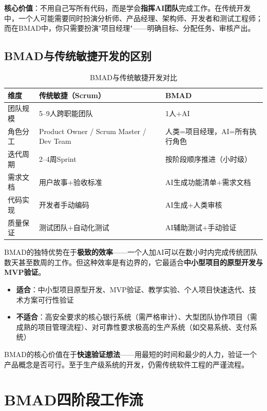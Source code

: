 \textbf{核心价值}：不用自己写所有代码，而是学会\textbf{指挥AI团队}完成工作。在传统开发中，一个人可能需要同时扮演分析师、产品经理、架构师、开发者和测试工程师；而在BMAD中，你只需要扮演"项目经理"——明确目标、分配任务、审核产出。

\subsection{BMAD与传统敏捷开发的区别}

\begin{table}[H]
\centering
\small
\begin{tabular}{lp{5cm}p{5cm}}
\toprule
\textbf{维度} & \textbf{传统敏捷（Scrum）} & \textbf{BMAD} \\
\midrule
团队规模 & 5--9人跨职能团队 & 1人+AI \\
角色分工 & Product Owner / Scrum Master / Dev Team & 人类=项目经理，AI=所有执行角色 \\
迭代周期 & 2--4周Sprint & 按阶段顺序推进（小时级） \\
需求文档 & 用户故事+验收标准 & AI生成功能清单+需求文档 \\
代码实现 & 开发者手动编码 & AI生成+人类审核 \\
质量保证 & 测试团队+自动化测试 & AI辅助测试+手动验证 \\
\bottomrule
\end{tabular}
\caption{BMAD与传统敏捷开发对比}
\end{table}

BMAD的独特优势在于\textbf{极致的效率}——一个人加AI可以在数小时内完成传统团队数天甚至数周的工作。但这种效率是有边界的，它最适合\textbf{中小型项目的原型开发与MVP验证}。

\begin{theorybox}[BMAD方法论的适用边界]
\begin{itemize}[leftmargin=2em]
  \item \textbf{适合}：中小型项目原型开发、MVP验证、教学实验、个人项目快速迭代、技术方案可行性验证
  \item \textbf{不适合}：高安全要求的核心银行系统（需严格审计）、大型团队协作项目（需成熟的项目管理流程）、对可靠性要求极高的生产系统（如交易系统、支付系统）
\end{itemize}
BMAD的核心价值在于\textbf{快速验证想法}——用最短的时间和最少的人力，验证一个产品概念是否可行。至于生产级系统的开发，仍需传统软件工程的严谨流程。
\end{theorybox}

\section{BMAD四阶段工作流}

